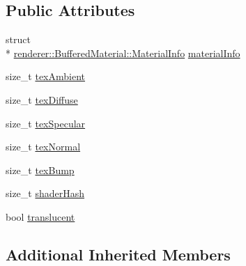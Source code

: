 \subsection*{Public Attributes}
\begin{DoxyCompactItemize}
\item 
struct \\*
\hyperlink{structrenderer_1_1BufferedMaterial_1_1MaterialInfo}{renderer\-::\-Buffered\-Material\-::\-Material\-Info} \hyperlink{classrenderer_1_1BufferedMaterial_a3fff0a4cd4738ae130490be9023a16c8}{material\-Info}
\item 
size\-\_\-t \hyperlink{classrenderer_1_1BufferedMaterial_a59b360766081f6a30a13df7a0f81c8af}{tex\-Ambient}
\item 
size\-\_\-t \hyperlink{classrenderer_1_1BufferedMaterial_a5d032d5a6f15704afa23e1c99ab29daa}{tex\-Diffuse}
\item 
size\-\_\-t \hyperlink{classrenderer_1_1BufferedMaterial_a439a1fd4872ab1dffd7c6fcf83e483b2}{tex\-Specular}
\item 
size\-\_\-t \hyperlink{classrenderer_1_1BufferedMaterial_a527a615c2eb8020bb5429549202adda0}{tex\-Normal}
\item 
size\-\_\-t \hyperlink{classrenderer_1_1BufferedMaterial_a21bcf8c72b68e328762445e45fd7ac6a}{tex\-Bump}
\item 
size\-\_\-t \hyperlink{classrenderer_1_1BufferedMaterial_ade27b244dbd7f1364dcef82783931b74}{shader\-Hash}
\item 
bool \hyperlink{classrenderer_1_1BufferedMaterial_aeef52c00da56487af165ddffc1be4f56}{translucent}
\end{DoxyCompactItemize}
\subsection*{Additional Inherited Members}


